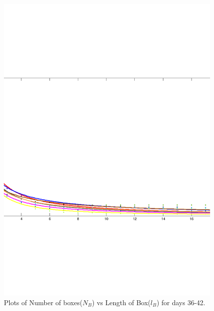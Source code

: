 \documentclass{article}
\begin{document}
\begin{figure}
\centering
\includegraphics[scale=0.3]{plot6/plot6}
\caption{Plots of Number of boxes($N_B$) vs Length of Box($l_B$) for days 36-42.}
\end{figure}
\end{document}
